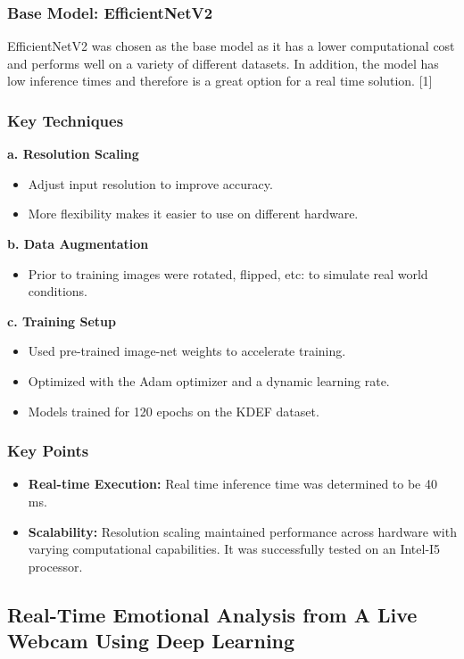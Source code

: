 \documentclass{article}
\begin{document}
\subsubsection*{Base Model: EfficientNetV2}
EfficientNetV2 was chosen as the base model as it has a lower computational cost and performs well on a variety of different datasets.
In addition, the model has low inference times and therefore is a great option for a real time solution. [1]

\subsubsection*{Key Techniques}
\textbf{a. Resolution Scaling}
\begin{itemize}
    \item Adjust input resolution to improve accuracy.
    \item More flexibility makes it easier to use on different hardware.
\end{itemize}

\textbf{b. Data Augmentation}
\begin{itemize}
    \item Prior to training images were rotated, flipped, etc: to simulate real world conditions.
\end{itemize}

\textbf{c. Training Setup}
\begin{itemize}
    \item Used pre-trained image-net weights to accelerate training.
    \item Optimized with the Adam optimizer and a dynamic learning rate.
    \item Models trained for 120 epochs on the KDEF dataset.
\end{itemize}

\subsubsection*{Key Points}
\begin{itemize}
    \item \textbf{Real-time Execution:} Real time inference time was determined to be 40 ms.
    \item \textbf{Scalability:} Resolution scaling maintained performance across hardware with varying computational capabilities. It was successfully tested on an Intel-I5 processor.
\end{itemize}

\subsection*{Real-Time Emotional Analysis from A Live Webcam Using Deep Learning}
\end{document}
